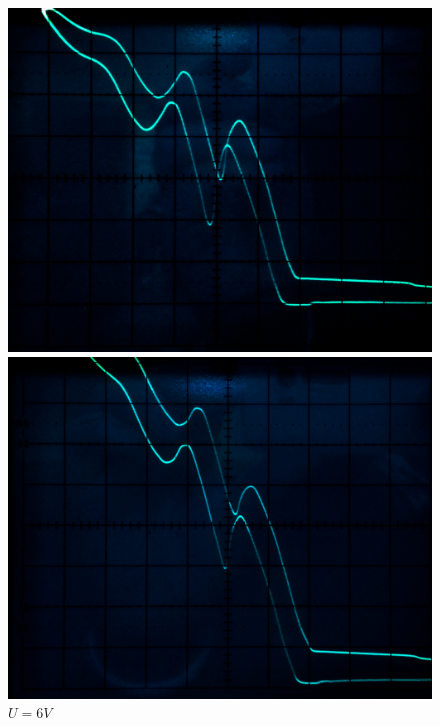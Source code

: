 \documentclass[a4paper,12pt]{article}
\begin{document}
		\begin{figure}[h!]
			\begin{center}
				\begin{minipage}{0.3\textwidth}
					\includegraphics[width=\textwidth]{4}
					\caption{$U = 4V$}
					\end{minipage}
					\hfill
					\begin{minipage}{0.3\textwidth}
						\includegraphics[width=\textwidth]{6}
						\caption{$U = 6V$}
					\end{minipage}
						\hfill
					\begin{minipage}{0.3\textwidth}

\end{minipage}
\end{center}
\end{figure}
\end{document}
